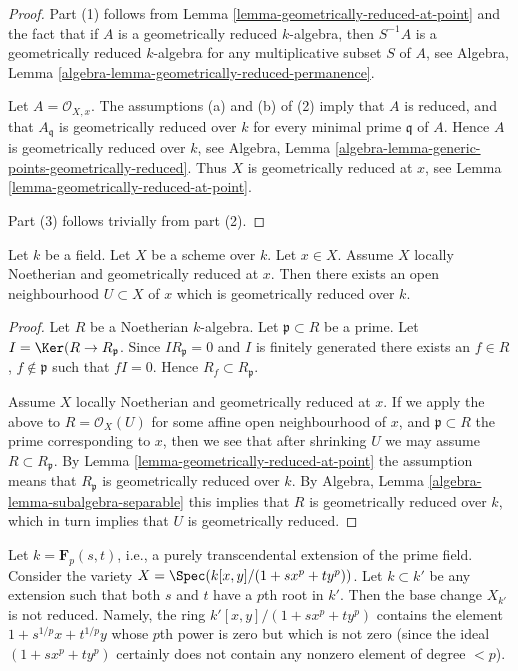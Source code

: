 \begin{proof}
Part (1) follows from
Lemma \ref{lemma-geometrically-reduced-at-point}
and the fact that if $A$ is a geometrically reduced
$k$-algebra, then $S^{-1}A$ is a geometrically reduced $k$-algebra for
any multiplicative subset $S$ of $A$, see
Algebra, Lemma \ref{algebra-lemma-geometrically-reduced-permanence}.

\medskip\noindent
Let $A = \mathcal{O}_{X, x}$. The assumptions (a) and (b) of (2) imply
that $A$ is reduced, and that $A_{\mathfrak q}$ is geometrically
reduced over $k$ for every minimal prime $\mathfrak q$ of $A$.
Hence $A$ is geometrically reduced over $k$, see
Algebra, Lemma \ref{algebra-lemma-generic-points-geometrically-reduced}.
Thus $X$ is geometrically reduced at $x$, see
Lemma \ref{lemma-geometrically-reduced-at-point}.

\medskip\noindent
Part (3) follows trivially from part (2).
\end{proof}

\begin{lemma}
\label{lemma-Noetherian-geometrically-reduced-at-point}
Let $k$ be a field.
Let $X$ be a scheme over $k$.
Let $x \in X$.
Assume $X$ locally Noetherian and geometrically reduced at $x$.
Then there exists an open neighbourhood $U \subset X$ of $x$
which is geometrically reduced over $k$.
\end{lemma}

\begin{proof}
Let $R$ be a Noetherian $k$-algebra.
Let $\mathfrak p \subset R$ be a prime.
Let $I = \Ker(R \to R_{\mathfrak p}$.
Since $IR_{\mathfrak p} = 0$ and $I$ is finitely generated
there exists an $f \in R$, $f \not \in \mathfrak p$ such that $fI = 0$.
Hence $R_f \subset R_{\mathfrak p}$.

\medskip\noindent
Assume $X$ locally Noetherian and geometrically reduced at $x$.
If we apply the above to $R = \mathcal{O}_X(U)$ for some affine
open neighbourhood of $x$, and $\mathfrak p \subset R$ the prime
corresponding to $x$, then we see that after shrinking $U$ we may
assume $R \subset R_{\mathfrak p}$. By
Lemma \ref{lemma-geometrically-reduced-at-point} the assumption
means that $R_{\mathfrak p}$ is geometrically reduced over $k$.
By Algebra, Lemma \ref{algebra-lemma-subalgebra-separable}
this implies that $R$ is geometrically reduced over $k$, which
in turn implies that $U$ is geometrically reduced.
\end{proof}

\begin{example}
\label{example-not-geometrically-reduced}
Let $k = \mathbf{F}_p(s, t)$, i.e., a purely transcendental extension
of the prime field. Consider the variety
$X = \Spec(k[x, y]/(1 + sx^p + ty^p))$.
Let $k \subset k'$ be any extension such that
both $s$ and $t$ have a $p$th root in $k'$.
Then the base change $X_{k'}$ is not reduced.
Namely, the ring $k'[x, y]/(1 + s x^p + ty^p)$ contains the element
$1 + s^{1/p}x + t^{1/p}y$ whose $p$th power is zero but
which is not zero (since the ideal $(1 + sx^p + ty^p)$ certainly
does not contain any nonzero element of degree $< p$).
\end{example}

